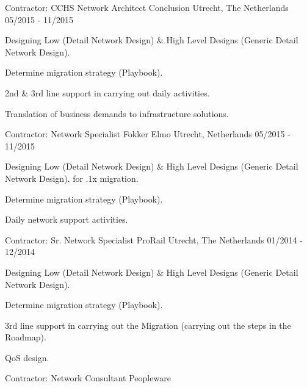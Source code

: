 \begin{cventries}
  \cventry
    {Contractor: CCHS Network Architect} %
    {Conclusion} %
    {Utrecht, The Netherlands} %
    {05/2015 - 11/2015} %
    {
      \begin{cvitems} %
          \item {Designing Low (Detail Network Design) \& High Level Designs (Generic Detail Network Design).}
    \item {Determine migration strategy (Playbook).}
    \item {2nd \& 3rd line support in carrying out daily activities.} 
    \item {Translation of business demands to infrastructure solutions.}
      \end{cvitems}
    }
 \cventry
    {Contractor: Network Specialist} %
    {Fokker Elmo} %
    {Utrecht, Netherlands} %
    {05/2015 - 11/2015} %
    {
      \begin{cvitems} %
          \item {Designing Low (Detail Network Design) \& High Level Designs (Generic Detail Network Design). for .1x migration.}
    \item {Determine migration strategy (Playbook).}
    \item {Daily network support activities.}
      \end{cvitems}
    }
  \cventry
    {Contractor: Sr. Network Specialist} %
    {ProRail} %
    {Utrecht, The Netherlands} %
    {01/2014 - 12/2014} %
    {
      \begin{cvitems} %
        \item {Designing Low (Detail Network Design) \& High Level Designs (Generic Detail Network Design).}
        \item {Determine migration strategy (Playbook).}
	\item {3rd line support in carrying out the Migration (carrying out the steps in the Roadmap).}
	\item {QoS design.}
      \end{cvitems}
    }
  \cventry
    {Contractor: Network Consultant} %
    {Peopleware} %

\end{cventries}
